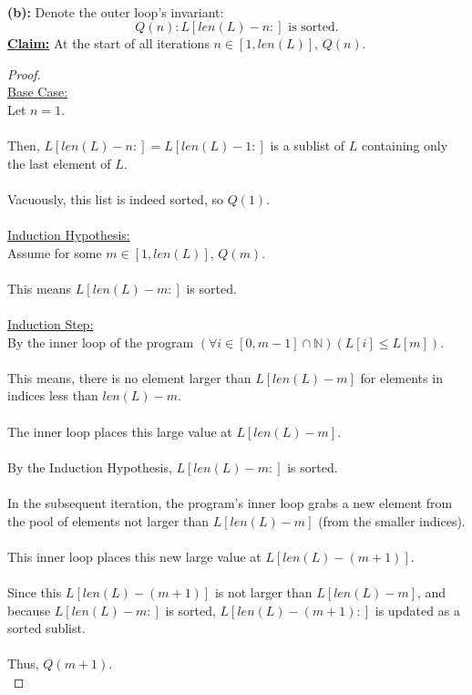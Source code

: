 \documentclass[12pt]{article}
\begin{document}
\leavevmode\\
\textbf{(b):} Denote the outer loop's invariant:
\[Q(n): L[len(L) - n:] \text{ is sorted.}\]
\textbf{\underline{Claim:}} At the start of all iterations $n \in [1, len(L)]$, $Q(n)$.
\begin{proof}
\leavevmode\\
    \underline{Base Case:} \\
    Let $n = 1$. \\
    \\
    Then, $L[len(L) - n:] = L[len(L) - 1:]$ is a sublist of $L$ containing only the last element of $L$. \\
    \\
    Vacuously, this list is indeed sorted, so $Q(1)$. \\
    \\
    \underline{Induction Hypothesis:} \\
    Assume for some $m \in [1, len(L)]$, $Q(m)$. \\
    \\
    This means $L[len(L) - m:]$ is sorted. \\
    \\
    \underline{Induction Step:} \\
    By the inner loop of the program $(\forall i \in [0, m - 1] \cap \mathbb{N})(L[i] \leq L[m])$. \\
    \\
    This means, there is no element larger than $L[len(L) - m]$ for elements in indices less than $len(L) - m$. \\
    \\
    The inner loop places this large value at $L[len(L) - m]$. \\
    \\
    By the Induction Hypothesis, $L[len(L) - m:]$ is sorted. \\
    \\
    In the subsequent iteration, the program's inner loop grabs a new element from the pool of elements not larger than $L[len(L) - m]$ (from the smaller indices). \\
    \\
    This inner loop places this new large value at $L[len(L) - (m + 1)]$. \\
    \\
    Since this $L[len(L) - (m + 1)]$ is not larger than $L[len(L) - m]$, and because $L[len(L) - m:]$ is sorted, $L[len(L) - (m + 1):]$ is updated as a sorted sublist. \\
    \\
    Thus, $Q(m + 1)$. \\
\end{proof}
\end{document}
